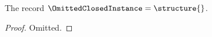 

\begin{instance}\label{omitted_closed_instance}
    The record $\OmittedClosedInstance=\structure{}$.
\end{instance}
\begin{proof}
    Omitted.
\end{proof}
